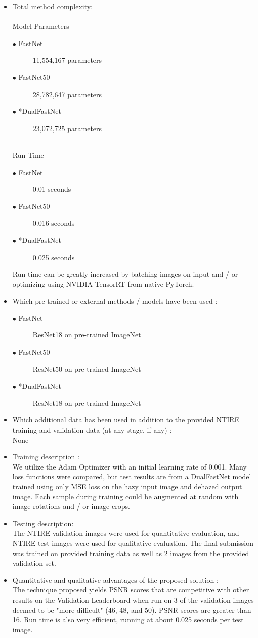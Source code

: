 \documentclass[12pt]{article}
\begin{document}
\begin{itemize}
\item Total method complexity:\\
\\Model Parameters
\begin{description}
  \item[$\bullet$ FastNet] 11,554,167 parameters  
  \item[$\bullet$ FastNet50] 28,782,647 parameters  
  \item[$\bullet$ *DualFastNet] 23,072,725 parameters 
\end{description}
\\Run Time
\begin{description}
  \item[$\bullet$ FastNet] 0.01 seconds 
  \item[$\bullet$ FastNet50] 0.016 seconds 
  \item[$\bullet$ *DualFastNet] 0.025 seconds 
\end{description}
Run time can be greatly increased by batching images on input and / or optimizing using NVIDIA TensorRT from native PyTorch. 
\item Which pre-trained or external methods / models have been used : 
\begin{description}
  \item[$\bullet$ FastNet] ResNet18 on pre-trained ImageNet 
  \item[$\bullet$ FastNet50] ResNet50 on pre-trained ImageNet 
  \item[$\bullet$ *DualFastNet] ResNet18 on pre-trained ImageNet 
\end{description}
\item Which additional data has been used in addition to the provided NTIRE training and validation data (at any stage, if any) :\\
None 
\item Training description : \\
We utilize the Adam Optimizer with an initial learning rate of 0.001. Many loss functions were compared, but test results are from a DualFastNet model trained using only MSE loss on the hazy input image and dehazed output image. Each sample during training could be augmented at random with image rotations and / or image crops.  
\item Testing description: \\
The NTIRE validation images were used for quantitative evaluation, and NTIRE test images were used for qualitative evaluation. The final submission was trained on provided training data as well as 2 images from the provided validation set.
\item Quantitative and qualitative advantages of the proposed solution :\\
The technique proposed yields PSNR scores that are competitive with other results on the Validation Leaderboard when run on 3 of the validation images deemed to be "more difficult" (46, 48, and 50). PSNR scores are greater than 16. Run time is also very efficient, running at about 0.025 seconds per test image.


\end{itemize}
\end{document}
